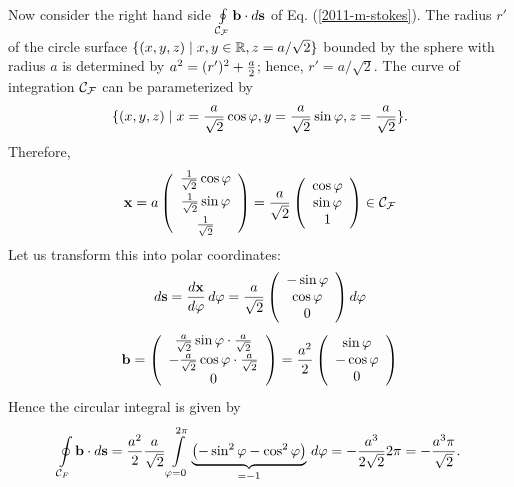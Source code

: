 {\begin{enumerate}
Now consider the right hand side $\oint \limits_{{\cal C}_{\cal F}} {\bf b} \cdot d{\bf s}$
of Eq. (\ref{2011-m-stokes}).
The radius $r'$ of the circle  surface
$\{(x,y,z) \mid x,y \in {\Bbb R} ,z=a/\sqrt{2}\}$ bounded by the sphere with radius $a$
is determined by
$ a^2 =(r')^2 +{a\over 2}$; hence, $r' =a/\sqrt{2}$.
The curve of integration ${\cal C}_{\cal F}$ can be parameterized by
$$\{(x,y,z) \mid
x={a\over \sqrt{2}} \cos \varphi,
y={a\over \sqrt{2}} \sin \varphi,
z={a\over \sqrt{2}}\}.$$
Therefore,
$$
  {\bf x} = a
  \left(
    \begin{array}{c}
      \frac{1}{\sqrt2}\cos\varphi \\[1ex]
      \frac{1}{\sqrt2}\sin\varphi \\[1ex]
      \frac{1}{\sqrt2}
    \end{array}
  \right)=
  \frac{a}{\sqrt{2}}
  \left(
    \begin{array}{c}
      \cos\varphi \\
      \sin\varphi \\
      1
    \end{array}
  \right)
\in {\cal C}_{\cal F}
$$
Let us transform this into polar coordinates:
$$
  d{\bf s}=\frac{d{\bf x}}{d\varphi} \,d\varphi =
  \frac{a}{\sqrt{2}}
  \left(
    \begin{array}{c}
      -\sin\varphi \\
      \cos\varphi \\
      0
    \end{array}
  \right) d\varphi
$$
$$
  {\bf b}=
  \left(
    \begin{array}{c}
      \frac{a}{\sqrt{2}}\sin\varphi\cdot\frac{a}{\sqrt{2}} \\
      -\frac{a}{\sqrt{2}}\cos\varphi\cdot\frac{a}{\sqrt{2}} \\
      0
    \end{array}
  \right)=
  \frac{a^2}{2}
  \left(
    \begin{array}{c}
      \sin\varphi \\
      -\cos\varphi \\
      0
    \end{array}
  \right)
$$
Hence the circular integral is given by
$$
  \oint \limits_{{\cal C}_F} {\bf b} \cdot d{\bf s}=
  \frac{a^2}{2}\frac{a}{\sqrt{2}}
  \int \limits_{\varphi=0}^{2 \pi}
  \underbrace
    {\left(-\sin^2\varphi-\cos^2\varphi\right)}
  _{=-1}
  \, d\varphi =
  -\frac{a^3}{2\sqrt{2}}2 \pi=-\frac{a^3 \pi}{\sqrt{2}}
.
$$




\end{enumerate}

\eexample
}

